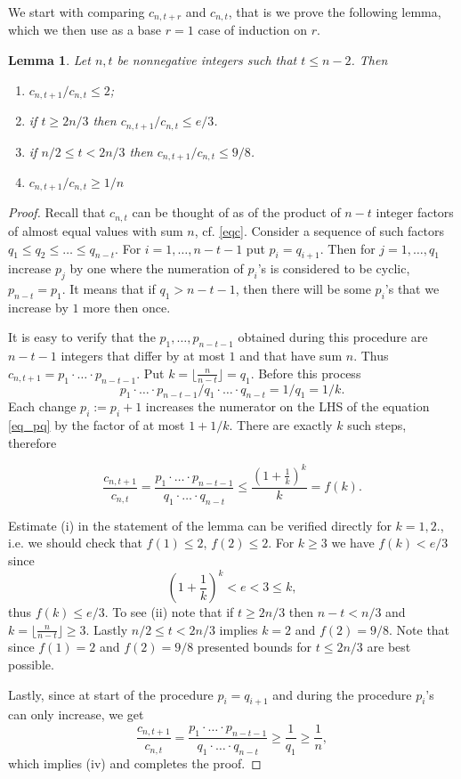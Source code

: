 \documentclass[11pt,letterpaper]{amsart}
\renewcommand{\le}{\leqslant}
\renewcommand{\ge}{\geqslant}
\newtheorem{lemma}[theorem]{Lemma}
\begin{document}
We start with comparing $c_{n, t+r}$ and $c_{n, t}$, that is we prove the following lemma, which we then use as a base  $r = 1$ case of induction on $r$.
    
\begin{lemma}\label{cnt_relative_base}
    Let $n,t$ be nonnegative integers such that $t\le n - 2$. Then 
    \begin{enumerate}[label=(\roman*)]
        \item $c_{n, t+1}/c_{n, t} \le 2$;
        \item if $t \ge 2n/3$ then $c_{n, t+1}/c_{n, t} \le e/3$.
        \item if $n/2 \le t < 2n/3$ then $c_{n, t+1}/c_{n, t} \le 9/8$.
        \item $c_{n, t+1}/c_{n, t} \ge 1/n$
    \end{enumerate}
\end{lemma}
\begin{proof}
     Recall that $c_{n,t}$ can be thought of as of the product of $n-t$ integer factors of almost equal values  with sum $n$, cf. \eqref{eqc}. Consider a sequence of such factors $q_1 \le q_2 \le \ldots \le q_{n-t}$. For $i = 1, \ldots, n - t - 1$ put $p_i = q_{i+1}$. Then for $j = 1, \ldots, q_1$ increase $p_j$ by one where the numeration of $p_i$'s is considered to be cyclic, $p_{n-t} = p_1$. It means that if $q_1 > n - t -1$, then there will be some $p_i$'s that we increase by $1$ more then once.

    It is easy to verify that the $p_1, \ldots, p_{n-t-1}$ obtained during this procedure are $n-t-1$ integers that differ by at most $1$ and that have sum $n$. Thus $c_{n, t+1} = p_1\cdot \ldots \cdot p_{n-t-1}$. Put $k = \lfloor \frac{n}{n-t}  \rfloor = q_1$. Before this process \begin{equation}\label{eq_pq}p_1\cdot\ldots\cdot p_{n-t-1}/q_1\cdot\ldots\cdot q_{n-t} = 1/q_1 = 1/k.\end{equation} Each change $p_i := p_i + 1$ increases the numerator on the LHS of the equation \eqref{eq_pq} by the factor of at most $1 + 1/k$. There are exactly $k$ such steps, therefore

    $$\frac{c_{n, t+1}}{c_{n, t}} = \frac{p_1\cdot\ldots\cdot p_{n-t-1}}{q_1\cdot\ldots\cdot q_{n - t}} \le \frac{\left(1 + \frac1k\right)^k}{k} = f(k).$$ 

    Estimate (i) in the statement of the lemma can be verified directly for $k=1, 2$., i.e. we should check that $f(1) \le 2$, $f(2) \le 2$. For $k \ge 3$ we have $f(k) < e/3$ since $$\left(1 + \frac1k\right)^k < e < 3\leqslant k,$$ thus $f(k) \le e/3$. To see (ii) note that if $t \ge 2n/3$ then $n-t < n/3$ and $k = \lfloor \frac n{n-t}\rfloor \ge 3$. Lastly $n/2 \le t < 2n/3$ implies $k=2$ and $f(2) = 9/8$. Note that since $f(1) = 2$ and $f(2) = 9/8$ presented bounds for $t \le 2n/3$ are best possible.

    Lastly, since at start of the procedure $p_i = q_{i + 1}$ and  during the procedure $p_i$'s can only increase, we get $$\frac{c_{n, t+1}}{c_{n, t}} = \frac{p_1\cdot\ldots\cdot p_{n-t-1}}{q_1\cdot\ldots\cdot q_{n - t}} \ge \frac1{q_1} \ge \frac1n,$$ which implies (iv) and completes the proof.
\end{proof}
\end{document}
